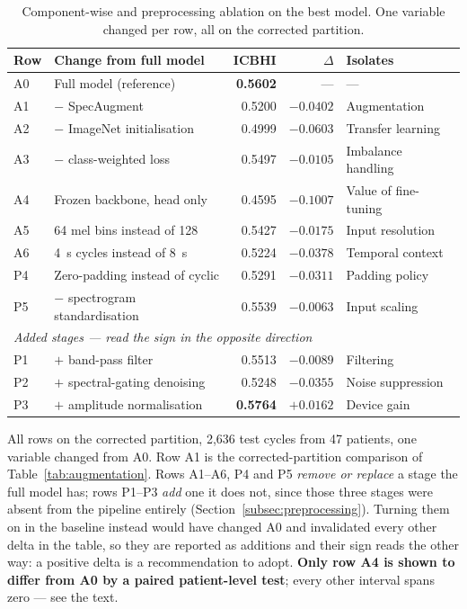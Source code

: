\documentclass[journal,onecolumn]{IEEEtran}
\newcommand{\best}[1]{\textbf{#1}}
\begin{document}
\begin{table}[!t]
\centering
\caption{Component-wise and preprocessing ablation on the best model. One variable
changed per row, all on the corrected partition.}
\label{tab:ablation}
\begin{tabular}{llrrl}
\toprule
Row & Change from full model & ICBHI & $\Delta$ & Isolates \\
\midrule
A0 & Full model (reference)          & \best{0.5602} & ---       & --- \\
A1 & $-$ SpecAugment                 & 0.5200 & $-0.0402$ & Augmentation \\
A2 & $-$ ImageNet initialisation     & 0.4999 & $-0.0603$ & Transfer learning \\
A3 & $-$ class-weighted loss         & 0.5497 & $-0.0105$ & Imbalance handling \\
A4 & Frozen backbone, head only      & 0.4595 & $-0.1007$ & Value of fine-tuning \\
A5 & 64 mel bins instead of 128      & 0.5427 & $-0.0175$ & Input resolution \\
A6 & 4~s cycles instead of 8~s       & 0.5224 & $-0.0378$ & Temporal context \\
\midrule
P4 & Zero-padding instead of cyclic  & 0.5291 & $-0.0311$ & Padding policy \\
P5 & $-$ spectrogram standardisation & 0.5539 & $-0.0063$ & Input scaling \\
\midrule
\multicolumn{5}{l}{\emph{Added stages --- read the sign in the opposite direction}}\\
P1 & $+$ band-pass filter            & 0.5513 & $-0.0089$ & Filtering \\
P2 & $+$ spectral-gating denoising   & 0.5248 & $-0.0355$ & Noise suppression \\
P3 & $+$ amplitude normalisation     & \best{0.5764} & $+0.0162$ & Device gain \\
\bottomrule
\end{tabular}

\vspace{2pt}
\footnotesize All rows on the corrected partition, 2{,}636 test cycles from 47 patients,
one variable changed from A0. Row A1 is the corrected-partition comparison of
Table~\ref{tab:augmentation}. Rows A1--A6, P4 and P5 \emph{remove or replace} a stage the
full model has; rows P1--P3 \emph{add} one it does not, since those three stages were
absent from the pipeline entirely (Section~\ref{subsec:preprocessing}). Turning them on in
the baseline instead would have changed A0 and invalidated every other delta in the table,
so they are reported as additions and their sign reads the other way: a positive delta is
a recommendation to adopt. \textbf{Only row A4 is shown to differ from A0 by a paired
patient-level test}; every other interval spans zero --- see the text.
\end{table}
\end{document}
